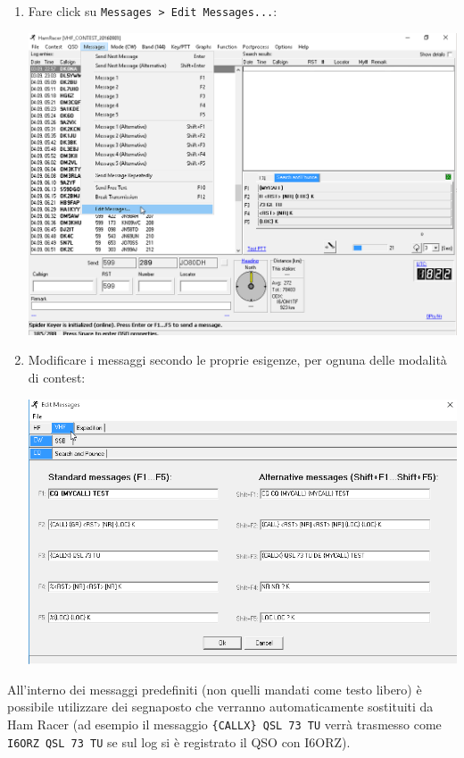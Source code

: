 \begin{enumerate}
	\item Fare click su \texttt{Messages > Edit Messages...}:
	\begin{center}
		\includegraphics[width=\linewidth]{./use04.png}
	\end{center}
	\item Modificare i messaggi secondo le proprie esigenze, per ognuna delle modalit\`a di contest:
	\begin{center}
		\includegraphics[width=\linewidth]{./use05.png}
	\end{center}
\end{enumerate}

All'interno dei messaggi predefiniti (non quelli mandati come testo libero) \`e possibile utilizzare dei segnaposto che verranno automaticamente sostituiti da Ham Racer (ad esempio il messaggio \texttt{\{CALLX\} QSL 73 TU} verr\`a trasmesso come \texttt{I6ORZ QSL 73 TU} se sul log si \`e registrato il QSO con I6ORZ).

